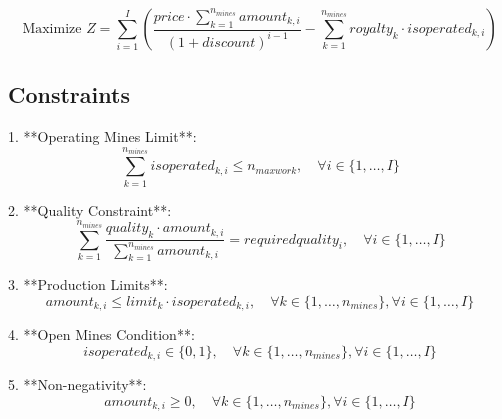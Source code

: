 \documentclass{article}
\begin{document}
\[
\text{Maximize } Z = \sum_{i=1}^{I} \left( \frac{price \cdot \sum_{k=1}^{n_{mines}} amount_{k,i}}{(1 + discount)^{i-1}} - \sum_{k=1}^{n_{mines}} royalty_k \cdot isoperated_{k,i} \right)
\]

\subsection*{Constraints}

1. **Operating Mines Limit**:
\[
\sum_{k=1}^{n_{mines}} isoperated_{k,i} \leq n_{maxwork}, \quad \forall i \in \{1, \ldots, I\}
\]

2. **Quality Constraint**:
\[
\sum_{k=1}^{n_{mines}} \frac{quality_k \cdot amount_{k,i}}{\sum_{k=1}^{n_{mines}} amount_{k,i}} = requiredquality_i, \quad \forall i \in \{1, \ldots, I\}
\]

3. **Production Limits**:
\[
amount_{k,i} \leq limit_k \cdot isoperated_{k,i}, \quad \forall k \in \{1, \ldots, n_{mines}\}, \forall i \in \{1, \ldots, I\}
\]

4. **Open Mines Condition**:
\[
isoperated_{k,i} \in \{0, 1\}, \quad \forall k \in \{1, \ldots, n_{mines}\}, \forall i \in \{1, \ldots, I\}
\]

5. **Non-negativity**:
\[
amount_{k,i} \geq 0, \quad \forall k \in \{1, \ldots, n_{mines}\}, \forall i \in \{1, \ldots, I\}
\]
\end{document}
